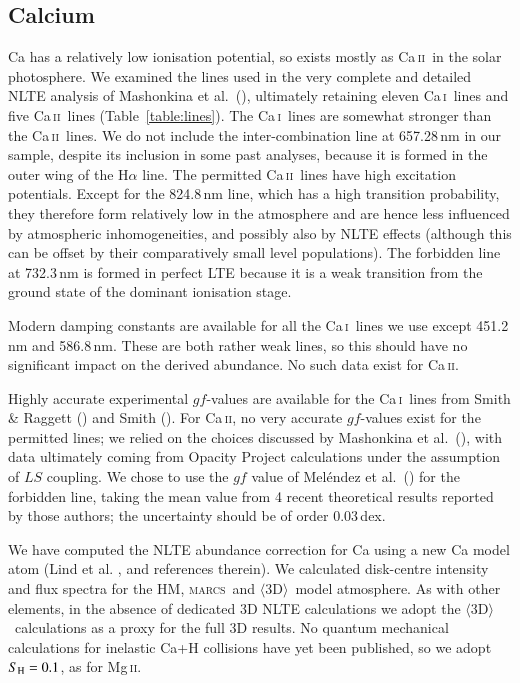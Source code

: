 \documentclass[traditabstract]{aa}
\newcommand{\oneDAV}{$\langle\mathrm{3D}\rangle$}
\newcommand{\marcs}{\textsc{marcs}}
\newcommand{\altmgii}{Mg\,\textsc{ii}}
\newcommand{\altcai}{Ca\,\textsc{i}}
\newcommand{\altcaii}{Ca\,\textsc{ii}}
\newcommand{\cai}{\altcai\ }
\newcommand{\caii}{\altcaii\ }
\begin{document}
\subsection{Calcium}
Ca has a relatively low ionisation potential, so exists mostly as \caii in the solar photosphere.  We examined the lines used in the very complete and detailed NLTE analysis of Mashonkina et al.\ (\cite{mash1}), ultimately retaining eleven \cai lines and five \caii lines (Table~\ref{table:lines}). The \cai lines are somewhat stronger than the \caii lines. We do not include the inter-combination line at 657.28\,nm in our sample, despite its inclusion in some past analyses, because it is formed in the outer wing of the H${\alpha}$ line. The permitted \caii lines have high excitation potentials.  Except for the 824.8\,nm line, which has a high transition probability, they therefore form relatively low in the atmosphere and are hence less influenced by atmospheric inhomogeneities, and possibly also by NLTE effects (although this can be offset by their comparatively small level populations).  The forbidden line at 732.3\,nm is formed in perfect LTE because it is a weak transition from the ground state of the dominant ionisation stage.

Modern damping constants are available for all the \cai lines we use except 451.2\,nm and 586.8\,nm.  These are both rather weak lines, so this should have no significant impact on the derived abundance.  No such data exist for \altcaii.

Highly accurate experimental $gf$-values are available for the \cai lines from Smith \& Raggett (\cite{smit}) and Smith (\cite{Smith88}). For \altcaii, no very accurate $gf$-values exist for the permitted lines; we relied on the choices discussed by Mashonkina et al.\ (\cite{mash1}), with data ultimately coming from Opacity Project calculations under the assumption of $LS$ coupling.  We chose to use the $gf$ value of Mel\'endez et al.\ (\cite{melen}) for the forbidden line, taking the mean value from 4 recent theoretical results reported by those authors; the uncertainty should be of order 0.03\,dex.

We have computed the NLTE abundance correction for Ca using a new Ca model atom (Lind et al. \cite{lind_li6}, and references therein).  We calculated disk-centre intensity and flux spectra for the HM, \marcs\ and \oneDAV\ model atmosphere.  As with other elements, in the absence of dedicated 3D NLTE calculations we adopt the \oneDAV\ calculations as a proxy for the full 3D results. No quantum mechanical calculations for inelastic Ca+H collisions have yet been published, so we adopt $S_{\rm H}=0.1$, as for \altmgii.
\end{document}
